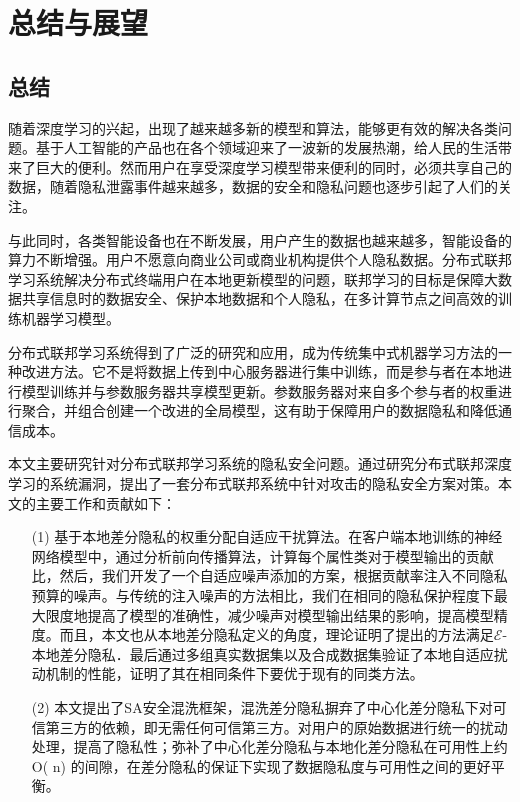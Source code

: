 \chapter{总结与展望}
\label{ch6}
\section{总结}
随着深度学习的兴起，出现了越来越多新的模型和算法，能够更有效的解决各类问题。基于人工智能的产品也在各个领域迎来了一波新的发展热潮，给人民的生活带来了巨大的便利。然而用户在享受深度学习模型带来便利的同时，必须共享自己的数据，随着隐私泄露事件越来越多，数据的安全和隐私问题也逐步引起了人们的关注。 

与此同时，各类智能设备也在不断发展，用户产生的数据也越来越多，智能设备的算力不断增强。用户不愿意向商业公司或商业机构提供个人隐私数据。分布式联邦学习系统解决分布式终端用户在本地更新模型的问题，联邦学习的目标是保障大数据共享信息时的数据安全、保护本地数据和个人隐私，在多计算节点之间高效的训练机器学习模型。 

分布式联邦学习系统得到了广泛的研究和应用，成为传统集中式机器学习方法的一种改进方法。它不是将数据上传到中心服务器进行集中训练，而是参与者在本地进行模型训练并与参数服务器共享模型更新。参数服务器对来自多个参与者的权重进行聚合，并组合创建一个改进的全局模型，这有助于保障用户的数据隐私和降低通信成本。 

本文主要研究针对分布式联邦学习系统的隐私安全问题。通过研究分布式联邦深度学习的系统漏洞，提出了一套分布式联邦系统中针对攻击的隐私安全方案对策。本文的主要工作和贡献如下：
\begin{enumerate}
\item [(1)] 基于本地差分隐私的权重分配自适应干扰算法。在客户端本地训练的神经网络模型中，通过分析前向传播算法，计算每个属性类对于模型输出的贡献比，然后，我们开发了一个自适应噪声添加的方案，根据贡献率注入不同隐私预算的噪声。与传统的注入噪声的方法相比，我们在相同的隐私保护程度下最大限度地提高了模型的准确性，减少噪声对模型输出结果的影响，提高模型精度。而且，本文也从本地差分隐私定义的角度，理论证明了提出的方法满足$\mathcal{E}$-本地差分隐私．最后通过多组真实数据集以及合成数据集验证了本地自适应扰动机制的性能，证明了其在相同条件下要优于现有的同类方法。

\item [(2)] 本文提出了SA安全混洗框架，混洗差分隐私摒弃了中心化差分隐私下对可信第三方的依赖，即无需任何可信第三方。对用户的原始数据进行统一的扰动处理，提高了隐私性；弥补了中心化差分隐私与本地化差分隐私在可用性上约O( n) 的间隙，在差分隐私的保证下实现了数据隐私度与可用性之间的更好平衡。
\end{enumerate}

